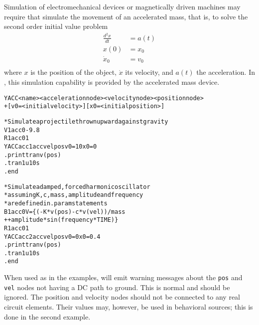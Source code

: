 


Simulation of electromechanical devices or magnetically driven machines may
require that \Xyce{} simulate the movement of an accelerated mass, that is, to
solve the second order initial value problem
\begin{eqnarray*}
\frac{d^2x}{dt} &= a(t) \\
x(0) &= x_0 \\
\dot{x}_0 &= v_0 \\
\end{eqnarray*}
where $x$ is the position of the object, $\dot{x}$ its velocity, and $a(t)$ the
acceleration.  In \Xyce{}, this simulation capability is provided by the
accelerated mass device.

\begin{Device}

\device
\begin{alltt}
YACC <name> <acceleration node> <velocity node> <position node>
+ [v0=<initial velocity>] [x0=<initial position>]
\end{alltt}

\examples
\begin{alltt}
* Simulate a projectile thrown upward against gravity
V1 acc 0 -9.8
R1 acc 0 1
YACC acc1 acc vel pos v0=10 x0=0
.print tran v(pos)
.tran 1u 10s
.end

* Simulate a damped, forced harmonic oscillator
* assuming K, c, mass, amplitude and frequency
* are defined in .param statements
B1 acc 0 V=\{(-K * v(pos) - c*v(vel))/mass
+            + amplitude*sin(frequency*TIME)\}
R1 acc 0 1
YACC acc2 acc vel pos v0=0 x0=0.4
.print tran v(pos)
.tran 1u 10s
.end
\end{alltt}

\comments

When used as in the examples, \Xyce{} will emit warning messages about the
\texttt{pos} and \texttt{vel} nodes not having a DC path to ground.  This is
normal and should be ignored. The position and velocity nodes should not be
connected to any real circuit elements.  Their values may, however, be used in
behavioral sources; this is done in the second example.

\end{Device}
